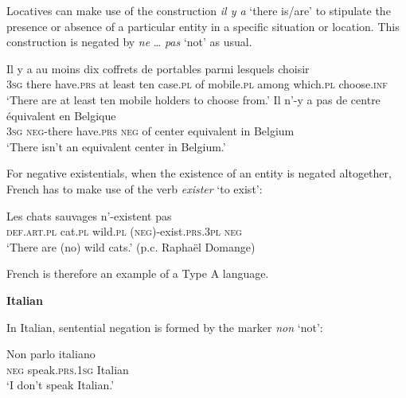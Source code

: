 ﻿\documentclass[output=paper]{langsci/langscibook}
\begin{document}
\begin{unindented}
Locatives can make use of the construction \textit{il y a} `there is\slash are' to stipulate the presence or absence of a particular entity in a specific situation or location. This construction is negated by \textit{ne} … \textit{pas} `not' as usual.
%
\begin{exe}\ex \gll
Il y a au moins dix coffrets de portables parmi lesquels choisir \\
\textsc{3sg} there have.\textsc{prs} at  least    ten case.\textsc{pl} of mobile.\textsc{pl} among which.\textsc{pl} choose.\textsc{inf} \\
    \glt `There are at least ten mobile holders to choose from.' \citep[274]{Offord2006}
\ex \gll Il n’-y a pas de centre équivalent en Belgique \\
\textsc{3sg} \textsc{neg}-there have.\textsc{prs} \textsc{neg}  of center equivalent in Belgium \\
    \glt `There isn't an equivalent center in Belgium.' \citep[208]{Offord2006}
    \end{exe}

For negative existentials, when the existence of an entity is negated altogether, French has to make use of the verb \textit{exister} `to exist':
%
\begin{exe}\ex \gll Les chats sauvages {\op}n’-{\cp}existent pas \\
\textsc{def.art.pl} cat.\textsc{pl} wild.\textsc{pl}   (\textsc{neg})-exist.\textsc{prs.3pl} \textsc{neg} \\
    \glt `There are (no) wild cats.' (p.c. Raphaël Domange)
    \end{exe}

French is therefore an example of a Type A language. 

\textbf{Italian}

In Italian, sentential negation is formed by the marker \textit{non} `not':
%
\begin{exe}\ex \gll Non parlo italiano \\
\textsc{neg} speak.\textsc{prs}.\textsc{1sg} Italian  \\
    \glt `I don't speak Italian.' \parencite[41]{PeyronelHiggins2006}
    \end{exe}


\end{unindented}
\end{document}
